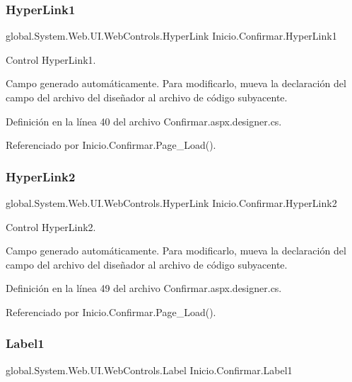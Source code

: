 \subsubsection{\texorpdfstring{HyperLink1}{HyperLink1}}
{\footnotesize\ttfamily global.\+System.\+Web.\+U\+I.\+Web\+Controls.\+Hyper\+Link Inicio.\+Confirmar.\+Hyper\+Link1\hspace{0.3cm}{\ttfamily [protected]}}



Control Hyper\+Link1. 

Campo generado automáticamente. Para modificarlo, mueva la declaración del campo del archivo del diseñador al archivo de código subyacente. 

Definición en la línea 40 del archivo Confirmar.\+aspx.\+designer.\+cs.



Referenciado por Inicio.\+Confirmar.\+Page\+\_\+\+Load().

\mbox{\label{classInicio_1_1Confirmar_adbc12b387c3590f83453888d8192db9a}} 
\subsubsection{\texorpdfstring{HyperLink2}{HyperLink2}}
{\footnotesize\ttfamily global.\+System.\+Web.\+U\+I.\+Web\+Controls.\+Hyper\+Link Inicio.\+Confirmar.\+Hyper\+Link2\hspace{0.3cm}{\ttfamily [protected]}}



Control Hyper\+Link2. 

Campo generado automáticamente. Para modificarlo, mueva la declaración del campo del archivo del diseñador al archivo de código subyacente. 

Definición en la línea 49 del archivo Confirmar.\+aspx.\+designer.\+cs.



Referenciado por Inicio.\+Confirmar.\+Page\+\_\+\+Load().

\mbox{\label{classInicio_1_1Confirmar_a0422c86bf977b315fd681b02c0f5f352}} 
\subsubsection{\texorpdfstring{Label1}{Label1}}
{\footnotesize\ttfamily global.\+System.\+Web.\+U\+I.\+Web\+Controls.\+Label Inicio.\+Confirmar.\+Label1\hspace{0.3cm}{\ttfamily [protected]}}



